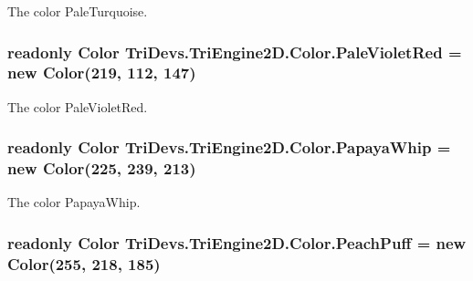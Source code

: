 The color Pale\-Turquoise. 

\hypertarget{struct_tri_devs_1_1_tri_engine2_d_1_1_color_a92982d46cc16cdeee62113b3c7974f3c}{
\subsubsection[{Pale\-Violet\-Red}]{\setlength{\rightskip}{0pt plus 5cm}readonly {\bf Color} Tri\-Devs.\-Tri\-Engine2\-D.\-Color.\-Pale\-Violet\-Red = new {\bf Color}(219, 112, 147)\hspace{0.3cm}{\ttfamily [static]}}}\label{struct_tri_devs_1_1_tri_engine2_d_1_1_color_a92982d46cc16cdeee62113b3c7974f3c}


The color Pale\-Violet\-Red. 

\hypertarget{struct_tri_devs_1_1_tri_engine2_d_1_1_color_ac477a628c53a2f8db0c6616753ba2079}{
\subsubsection[{Papaya\-Whip}]{\setlength{\rightskip}{0pt plus 5cm}readonly {\bf Color} Tri\-Devs.\-Tri\-Engine2\-D.\-Color.\-Papaya\-Whip = new {\bf Color}(225, 239, 213)\hspace{0.3cm}{\ttfamily [static]}}}\label{struct_tri_devs_1_1_tri_engine2_d_1_1_color_ac477a628c53a2f8db0c6616753ba2079}


The color Papaya\-Whip. 

\hypertarget{struct_tri_devs_1_1_tri_engine2_d_1_1_color_a945ef3c2c73d9788c0f597b443047368}{
\subsubsection[{Peach\-Puff}]{\setlength{\rightskip}{0pt plus 5cm}readonly {\bf Color} Tri\-Devs.\-Tri\-Engine2\-D.\-Color.\-Peach\-Puff = new {\bf Color}(255, 218, 185)\hspace{0.3cm}{\ttfamily [static]}}}\label{struct_tri_devs_1_1_tri_engine2_d_1_1_color_a945ef3c2c73d9788c0f597b443047368}


